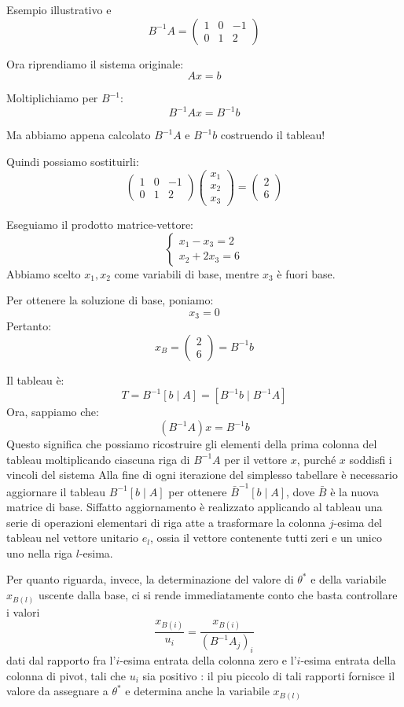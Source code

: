 \begin{example}{Esempio illustrativo}
e
\[
B^{-1}A=
\begin{pmatrix}
1&0&-1\\
0&1&2
\end{pmatrix}
\]

Ora riprendiamo il sistema originale:
\[
Ax=b
\]

Moltiplichiamo per \(B^{-1}\):
\[
B^{-1}Ax=B^{-1}b
\]

Ma abbiamo appena calcolato \(B^{-1}A\) e \(B^{-1}b\) costruendo il tableau!

Quindi possiamo sostituirli:
\[
\begin{pmatrix}
1&0&-1\\
0&1&2
\end{pmatrix}
\begin{pmatrix}
x_1\\x_2\\x_3
\end{pmatrix}
=
\begin{pmatrix}
2\\6
\end{pmatrix}
\]

Eseguiamo il prodotto matrice-vettore:
\[
\boxed{
\begin{cases}
x_1-x_3=2\\
x_2+2x_3=6
\end{cases}
}
\]
Abbiamo scelto \(x_1,x_2\) come variabili di base, mentre \(x_3\) è fuori base.

Per ottenere la soluzione di base, poniamo:
\[
x_3=0
\]
Pertanto:
\[
\boxed{x_B=\begin{pmatrix}2\\6\end{pmatrix}=B^{-1}b}
\]
\end{example}
Il tableau è:
\[
\boxed{T=B^{-1}[b\mid A]=[B^{-1}b\mid B^{-1}A]}
\]
Ora, sappiamo che:
\[
\boxed{(B^{-1}A)x=B^{-1}b}
\]
Questo significa che possiamo ricostruire gli elementi della prima colonna del tableau moltiplicando ciascuna riga di \(B^{-1}A\) per il vettore \(x\), purché \(x\) soddisfi i vincoli del sistema
Alla fine di ogni iterazione del simplesso tabellare è necessario aggiornare
il tableau $B^{-1}[b \mid A]$ per ottenere $\bar{B}^{-1}[b \mid A]$,
dove $\bar{B}$ è la nuova matrice di base.
Siffatto aggiornamento è realizzato applicando al tableau una serie di
operazioni elementari di riga atte a trasformare la colonna $j$-esima
del tableau nel vettore unitario $e_l$, ossia il vettore contenente
tutti zeri e un unico uno nella riga $l$-esima.

Per quanto riguarda, invece, la determinazione del valore di $\theta^*$
e della variabile $x_{B(l)}$ uscente dalla base, ci si rende immediatamente
conto che basta controllare i valori
\[
\frac{x_{B(i)}}{u_i} = \frac{x_{B(i)}}{(B^{-1}A_j)_i}
\]
dati dal rapporto fra l'$i$-esima entrata della colonna zero e l'$i$-esima entrata della colonna di pivot, tali che $u_i$ sia positivo : 
il piu piccolo di tali rapporti fornisce il valore da assegnare a $\theta^*$ e determina
anche la variabile $x_{B(l)}$


